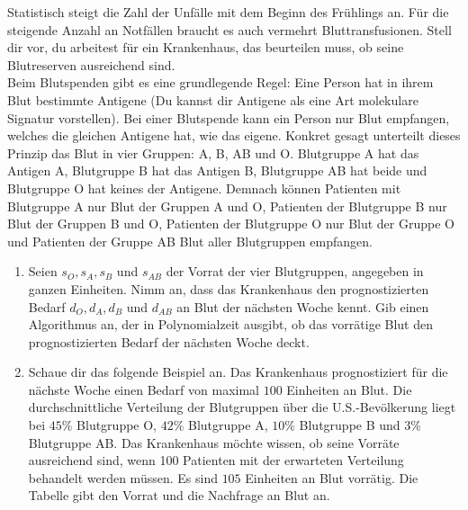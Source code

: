 \documentclass{uebung_cs}
\begin{document}
\begin{aufgabe}
\begin{figure}[ht]
\begin{minipage}[b]{0.5\textwidth}
    	
    	\end{minipage}
    \end{figure}
\end{aufgabe}

\begin{aufgabe}[Blutspende]
    Statistisch steigt die Zahl der Unfälle mit dem Beginn des Frühlings an. Für die steigende Anzahl an Notfällen braucht es auch vermehrt Bluttransfusionen. Stell dir vor, du arbeitest für ein Krankenhaus, das beurteilen muss, ob seine Blutreserven ausreichend sind.\\
    Beim Blutspenden gibt es eine grundlegende Regel: Eine Person hat in ihrem Blut bestimmte Antigene (Du kannst dir Antigene als eine Art molekulare Signatur vorstellen). Bei einer Blutspende kann ein Person nur Blut empfangen, welches die gleichen Antigene hat, wie das eigene. Konkret gesagt unterteilt dieses Prinzip das Blut in vier Gruppen: A, B, AB und O. Blutgruppe A hat das Antigen A, Blutgruppe B hat das Antigen B, Blutgruppe AB hat beide und Blutgruppe O hat keines der Antigene. Demnach können Patienten mit Blutgruppe A nur Blut der Gruppen A und O, Patienten der Blutgruppe B nur Blut der Gruppen B und O, Patienten der Blutgruppe O nur Blut der Gruppe O und Patienten der Gruppe AB Blut aller Blutgruppen empfangen.
    \begin{enumerate}
    	\item Seien $s_O,s_A,s_B$ und $s_{AB}$ der Vorrat der vier Blutgruppen, angegeben in ganzen Einheiten. Nimm an, dass das Krankenhaus den prognostizierten Bedarf $d_O, d_A,d_B$ und $d_{AB}$ an Blut der nächsten Woche kennt. Gib einen Algorithmus an, der in Polynomialzeit ausgibt, ob das vorrätige Blut den prognostizierten Bedarf der nächsten Woche deckt.\\
    	\item Schaue dir das folgende Beispiel an. Das Krankenhaus prognostiziert für die nächste Woche einen Bedarf von maximal $100$ Einheiten an Blut. Die durchschnittliche Verteilung der Blutgruppen über die U.S.-Bevölkerung liegt bei $45\%$ Blutgruppe O, $42\%$ Blutgruppe A, $10\%$ Blutgruppe B und $3\%$ Blutgruppe AB. Das Krankenhaus möchte wissen, ob seine Vorräte ausreichend sind, wenn 100 Patienten mit der erwarteten Verteilung behandelt werden müssen. Es sind $105$ Einheiten an Blut vorrätig. Die Tabelle gibt den Vorrat und die Nachfrage an Blut an.
    	

\end{enumerate}
\end{aufgabe}
\end{document}
